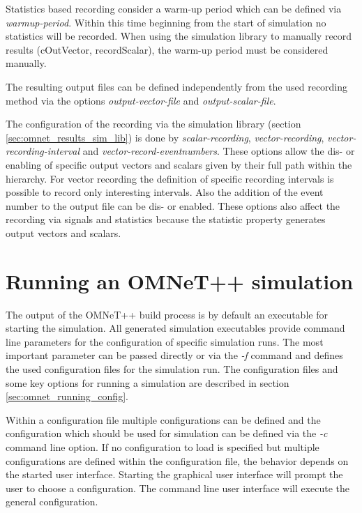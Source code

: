 Statistics based recording consider a warm-up period which can be defined via \emph{warmup-period}.
Within this time beginning from the start of simulation no statistics will be recorded.
When using the simulation library to manually record results (cOutVector, recordScalar), the warm-up period must be considered manually. \cite[section 12.2.2]{omnet_manual}

The resulting output files can be defined independently from the used recording method via the options \emph{output-vector-file} and \emph{output-scalar-file}. \cite[section 12.2.3]{omnet_manual}

The configuration of the recording via the simulation library (section \ref{sec:omnet_results_sim_lib}) is done by \emph{scalar-recording}, \emph{vector-recording}, \emph{vector-recording-interval} and \emph{vector-record-eventnumbers}.
These options allow the dis- or enabling of specific output vectors and scalars given by their full path within the hierarchy.
For vector recording the definition of specific recording intervals is possible to record only interesting intervals.
Also the addition of the event number to the output file can be dis- or enabled.
These options also affect the recording via signals and statistics because the statistic property generates output vectors and scalars. \cite[section 12.2.4, section 12.2.5]{omnet_manual}

\section{Running an OMNeT++ simulation}
\label{sec:omnet_running}
The output of the OMNeT++ build process is by default an executable for starting the simulation.
All generated simulation executables provide command line parameters for the configuration of specific simulation runs.
The most important parameter can be passed directly or via the \emph{-f} command and defines the used configuration files for the simulation run.
The configuration files and some key options for running a simulation are described in section \ref{sec:omnet_running_config}.

Within a configuration file multiple configurations can be defined and the configuration which should be used for simulation can be defined via the \emph{-c} command line option.
If no configuration to load is specified but multiple configurations are defined within the configuration file, the behavior depends on the started user interface.
Starting the graphical user interface will prompt the user to choose a configuration.
The command line user interface will execute the general configuration.

